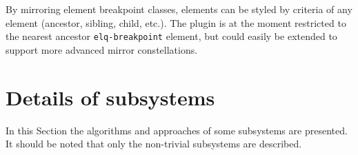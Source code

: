 \documentclass[a4paper,11pt]{kth-mag}
\newcommand{\code}[1]{\texttt{#1}}
\begin{document}
          By mirroring element breakpoint classes, \glspl{element} can be styled by criteria of any element (ancestor, sibling, child, etc.).
          The plugin is at the moment restricted to the nearest ancestor \code{elq-breakpoint} \gls{element}, but could easily be extended to support more advanced mirror constellations.
    \section{Details of subsystems}\label{sec:library-imp-details}
      In this Section the algorithms and approaches of some subsystems are presented.
      It should be noted that only the non-trivial subsystems are described.

\end{document}

